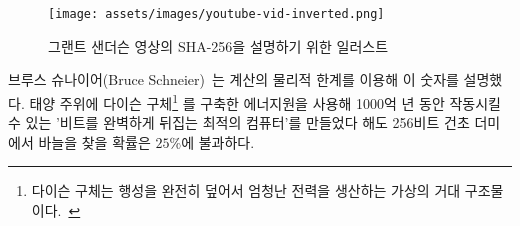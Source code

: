 \begin{comment}
	\begin{figure}
		\texttt{[image: assets/images/youtube-vid-inverted.png]}
		\caption{Illustration of SHA-256 security. Original graphic by Grant Sanderson aka 3Blue1Brown.}
		\label{fig:youtube-vid-inverted}
	\end{figure}
\end{comment}
\begin{figure}
	\texttt{[image: assets/images/youtube-vid-inverted.png]}
	\caption{그랜트 샌더슨 영상의 SHA-256을 설명하기 위한 일러스트}
	\label{fig:youtube-vid-inverted}
\end{figure}

\begin{comment}
	Bruce Schneier~\cite{web:schneier} used the physical limits of computation to put this
	number into perspective: even if we could build an optimal computer,
	which would use any provided energy to flip bits perfectly~\cite{wiki:landauer}, build a
	Dyson sphere\footnote{A Dyson sphere is a hypothetical megastructure that completely encompasses a star and captures a large percentage of its power output.~\cite{wiki:dyson}} around our sun, and let it run for 100 billion billion
	years, we would still only have a $25\%$ chance to find a needle in a
	256-bit haystack.
\end{comment}
브루스 슈나이어(Bruce Schneier)~\cite{web:schneier}는 계산의 물리적 한계를 이용해 이 숫자를 설명했다.
태양 주위에 다이슨 구체\footnote{다이슨 구체는 행성을 완전히 덮어서 엄청난 전력을 생산하는 가상의 거대 구조물이다.~\cite{wiki:dyson}}
를 구축한 에너지원을 사용해 1000억 년 동안 작동시킬 수 있는 '비트를 완벽하게 뒤집는 최적의 컴퓨터'를 만들었다 해도 256비트 건초 더미에서 바늘을 찾을 확률은 $25\%$에 불과하다.

